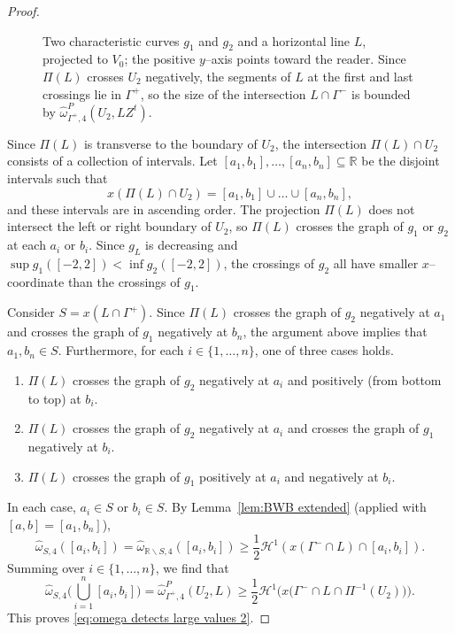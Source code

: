 \documentclass[11pt,reqno]{amsart}
\newcommand{\wwidehat}[1]{\widehat{#1}}
\newcommand{\R}{\mathbb{R}}
\newcommand{\cH}{\mathcal{H}}
\newcommand{\0}{\mathbf{0}}
\renewcommand{\1}{\mathbf 1}
\renewcommand{\subset}{\subseteq}
\renewcommand{\ge}{\geqslant}
\renewcommand{\setminus}{\smallsetminus}
\newcommand{\n}{\{1,\ldots,n\}}
\theoremstyle{remark}
\begin{document}
\begin{proof}
  \begin{figure}[h]\label{fig:two horizontal curves and a line}
  \begin{centering}
    
  \end{centering}
  \caption{
    Two characteristic curves $g_1$ and $g_2$ and a horizontal line $L$, projected to $V_0$; the positive $y$--axis points toward the reader.  Since $\Pi(L)$ crosses $U_2$ negatively, the segments of $L$ at the first and last crossings  lie in $\Gamma^+$, so the size of the intersection $L\cap \Gamma^-$ is bounded by $\wwidehat{\omega}^P_{\Gamma^+, 4}(U_2, LZ^t)$.
  }
\end{figure}

  Since $\Pi(L)$ is transverse to the boundary of $U_2$, the intersection $\Pi(L)\cap U_2$ consists of a collection of intervals.  Let $[a_1,b_1],\dots, [a_n,b_n]\subset \R$ be the disjoint intervals such that
  $$x(\Pi(L)\cap U_2)=[a_1,b_1]\cup \dots \cup [a_n,b_n],$$
  and these intervals are in ascending order.  The projection $\Pi(L)$ does not intersect the left or right boundary of $U_2$, so $\Pi(L)$ crosses the graph of $g_1$ or $g_2$ at each $a_i$ or $b_i$.  Since $g_L$ is decreasing and $\sup g_1([-2,2]) < \inf g_2([-2,2])$, the crossings of $g_2$ all have smaller $x$--coordinate than the crossings of $g_1$.

  Consider  $S=x(L \cap \Gamma^+)$.  Since $\Pi(L)$ crosses the graph of $g_2$ negatively at $a_1$ and crosses the graph of $g_1$ negatively at $b_n$, the argument above implies that $a_1,b_n\in S$.  Furthermore, for each $i\in \n$, one of three cases holds.
  \begin{enumerate}
  \item $\Pi(L)$ crosses the graph of $g_2$ negatively at $a_i$ and positively (from bottom to top) at $b_i$.
  \item $\Pi(L)$ crosses the graph of $g_2$ negatively at $a_i$ and crosses the graph of $g_1$ negatively at $b_i$.
  \item $\Pi(L)$ crosses the graph of $g_1$ positively at $a_i$ and negatively at $b_i$.
  \end{enumerate}
  In each case, $a_i\in S$ or $b_i\in S$.  By Lemma~\ref{lem:BWB extended} (applied with $[a,b]=[a_1,b_n]$),
  $$\widehat{\omega}_{S, 4}([a_i,b_i]) = \widehat{\omega}_{\R\setminus S, 4}([a_i,b_i]) \ge \frac{1}{2} \cH^1(x(\Gamma^-\cap L)\cap [a_i,b_i]).$$
  Summing over $i\in \n$, we find that
  \begin{equation}\label{eq:omega detects large values}
    \widehat{\omega}_{S, 4}\Big(\bigcup_{i=1}^n [a_i,b_i]\Big)=\wwidehat{\omega}^P_{\Gamma^+, 4}(U_2, L) \ge \frac{1}{2} \cH^1\Big(x\big(\Gamma^-\cap L \cap \Pi^{-1}(U_2)\big)\Big).
  \end{equation}
This proves \eqref{eq:omega detects large values 2}.


\end{proof}
\end{document}
